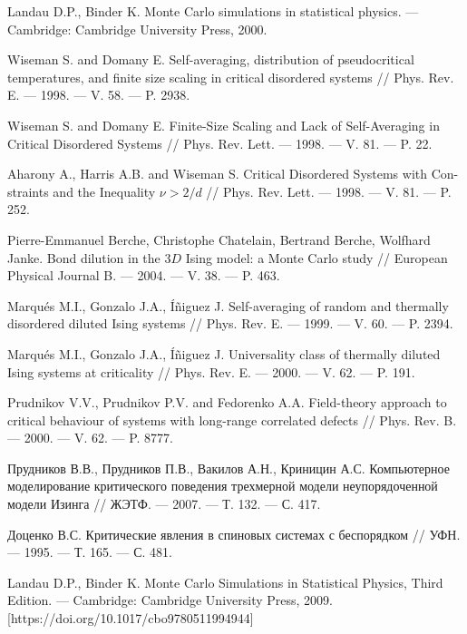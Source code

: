 \begin{thebibliography}{111}
Landau D.P., Binder K.
Monte Carlo simulations in statistical physics. --- Cambridge: Cambridge University Press, 2000.




Wiseman S. and Domany E. Self-averaging, distribution of pseudocritical temperatures, and finite size scaling in critical disordered systems // Phys. Rev. E. --- 1998. ---  V. 58. --- P. 2938.

Wiseman S. and Domany E. Finite-Size Scaling and Lack of Self-Averaging in Critical Disordered Systems // Phys. Rev. Lett. --- 1998. --- V. 81. --- P. 22.

Aharony A., Harris A.B. and Wiseman S. Critical Disordered Systems with Con-straints and the Inequality $\nu > 2/d$  // Phys. Rev. Lett. --- 1998. --- V. 81. --- P. 252.

Pierre-Emmanuel Berche, Christophe Chatelain, Bertrand Berche, Wolfhard Janke. Bond dilution in the $3D$ Ising model: a Monte Carlo study // European Physical Journal B. --- 2004. --- V. 38. --- P. 463.

Marqués M.I., Gonzalo J.A., Íñiguez J. Self-averaging of random and thermally disordered diluted Ising systems // Phys. Rev. E. --- 1999. --- V. 60. --- P. 2394.

Marqués M.I., Gonzalo J.A., Íñiguez J. Universality class of thermally diluted Ising systems at criticality // Phys. Rev. E. --- 2000. --- V. 62. --- P. 191.

Prudnikov V.V., Prudnikov P.V. and Fedorenko A.A. Field-theory approach to critical behaviour of systems with long-range correlated defects // Phys. Rev. B. --- 2000. --- V. 62. --- P. 8777.

Прудников В.В., Прудников П.В., Вакилов А.Н., Криницин А.С. Компьютерное моделирование критического поведения трехмерной модели неупорядоченной модели Изинга // ЖЭТФ. --- 2007. --- Т. 132. --- С. 417.

Доценко В.С. Критические явления в спиновых системах с беспорядком // УФН. --- 1995. --- Т. 165. --- С. 481.








Landau D.P., Binder K. Monte Carlo Simulations in Statistical Physics, Third Edition. --- Cambridge: Cambridge University Press, 2009. [https://doi.org/10.1017/cbo9780511994944]


\end{thebibliography}
